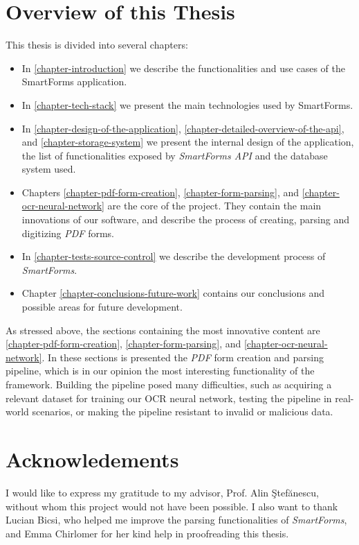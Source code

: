 \documentclass[11pt, a4paper]{report}
\begin{document}
\section{Overview of this Thesis}

This thesis is divided into several chapters:
\begin{itemize}
	\item In \autoref{chapter-introduction} we describe the functionalities and use cases of the SmartForms application.
	\item In \autoref{chapter-tech-stack} we present the main technologies used by SmartForms.
	\item In \autoref{chapter-design-of-the-application}, \autoref{chapter-detailed-overview-of-the-api}, and \autoref{chapter-storage-system} we present the internal design of the application, the list of functionalities exposed by \textit{SmartForms API} and the database system used.
	\item Chapters \ref{chapter-pdf-form-creation}, \ref{chapter-form-parsing}, and \ref{chapter-ocr-neural-network} are the core of the project. They contain the main innovations of our software, and describe the process of creating, parsing and digitizing \textit{PDF} forms.
	\item In \autoref{chapter-tests-source-control} we describe the development process of \textit{SmartForms}.
	\item Chapter \ref{chapter-conclusions-future-work} contains our conclusions and possible areas for future development.
\end{itemize}

As stressed above, the sections containing the most innovative content are  \autoref{chapter-pdf-form-creation}, \autoref{chapter-form-parsing}, and \autoref{chapter-ocr-neural-network}. In these sections is presented the \textit{PDF} form creation and parsing pipeline, which is in our opinion the most interesting functionality of the framework. Building the pipeline posed many difficulties, such as acquiring a relevant dataset for training our OCR neural network, testing the pipeline in real-world scenarios, or making the pipeline resistant to invalid or malicious data. 


\section{Acknowledements}

I would like to express my gratitude to my advisor, Prof. Alin \c Stef\u anescu, without whom this project would not have been possible. I also want to thank Lucian Bicsi, who helped me improve the parsing functionalities of \textit{SmartForms}, and Emma Chirlomer for her kind help in proofreading this thesis.
\end{document}
